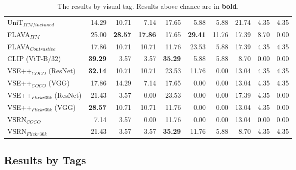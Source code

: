 \documentclass[10pt,twocolumn,letterpaper]{article}
\begin{document}
\begin{table*}
{\begin{tabular}{lrrr|rrr|rrr}
 UniT$_{ITM finetuned}$       & 14.29          & 10.71          & 7.14           & 17.65          & 5.88           & 5.88           & 21.74          & 4.35           & 4.35           \\
 FLAVA$_{ITM}$                & 25.00          & \textbf{28.57} & \textbf{17.86} & 17.65          & \textbf{29.41} & 11.76 & 17.39          &  8.70 &  0.00 \\
 FLAVA$_{Contrastive}$        & 17.86          & 10.71          & 10.71          & 11.76          & 23.53          & 5.88           & 17.39          & 4.35           &  4.35 \\
 CLIP (ViT-B/32)              & \textbf{39.29} & 3.57           & 3.57           & \textbf{35.29} & 5.88           & 5.88           & 8.70           & 0.00           & 0.00           \\
 VSE++$_{COCO}$ (ResNet)      & \textbf{32.14} & 10.71          & 10.71          & 23.53          & 11.76          & 0.00           & 13.04          & 4.35           & 4.35           \\
 VSE++$_{COCO}$ (VGG)         & 17.86          & 14.29          & 7.14           & 17.65          & 0.00           & 0.00           & 13.04          & 4.35           & 4.35           \\
 VSE++$_{Flickr30k}$ (ResNet) & 21.43          & 3.57           & 0.00           & 23.53          & 0.00           & 0.00           & 17.39          & 4.35           & 0.00           \\
 VSE++$_{Flickr30k}$ (VGG)    & \textbf{28.57} & 10.71          & 10.71          & 11.76          & 0.00           & 0.00           & 13.04          & 4.35           & 0.00           \\
 VSRN$_{COCO}$                & 7.14           & 3.57           & 0.00           & 11.76          & 0.00           & 0.00           & 13.04          & 0.00           & 0.00           \\
 VSRN$_{Flickr30k}$           & 21.43          & 3.57           & 3.57           & \textbf{35.29} & 11.76          & 5.88           & 8.70           & 4.35           & 4.35           \\
    \bottomrule
  \end{tabular}
  }
  \caption{The results by visual tag. Results above chance are in \textbf{bold}.}
    \label{tab:results-by-visual-tag}
\end{table*}

\subsection{Results by Tags}
\end{document}

